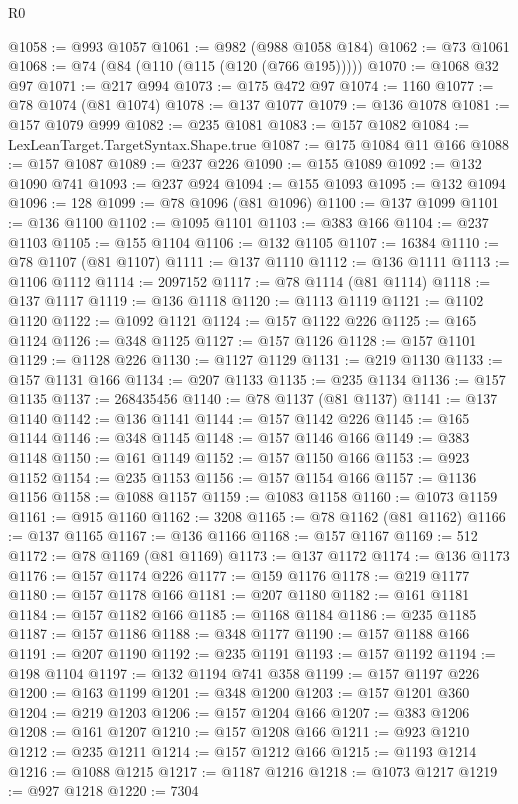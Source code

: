 \begin{lexlean}{R0}
\begin{coremodule}
@1058 := @993 @1057
@1061 := @982 (@988 @1058 @184)
@1062 := @73 @1061
@1068 := @74 (@84 (@110 (@115 (@120 (@766 @195)))))
@1070 := @1068 @32 @97
@1071 := @217 @994
@1073 := @175 @472 @97
@1074 := 1160
@1077 := @78 @1074 (@81 @1074)
@1078 := @137 @1077
@1079 := @136 @1078
@1081 := @157 @1079 @999
@1082 := @235 @1081
@1083 := @157 @1082
@1084 := LexLeanTarget.TargetSyntax.Shape.true
@1087 := @175 @1084 @11 @166
@1088 := @157 @1087
@1089 := @237 @226
@1090 := @155 @1089
@1092 := @132 @1090 @741
@1093 := @237 @924
@1094 := @155 @1093
@1095 := @132 @1094
@1096 := 128
@1099 := @78 @1096 (@81 @1096)
@1100 := @137 @1099
@1101 := @136 @1100
@1102 := @1095 @1101
@1103 := @383 @166
@1104 := @237 @1103
@1105 := @155 @1104
@1106 := @132 @1105
@1107 := 16384
@1110 := @78 @1107 (@81 @1107)
@1111 := @137 @1110
@1112 := @136 @1111
@1113 := @1106 @1112
@1114 := 2097152
@1117 := @78 @1114 (@81 @1114)
@1118 := @137 @1117
@1119 := @136 @1118
@1120 := @1113 @1119
@1121 := @1102 @1120
@1122 := @1092 @1121
@1124 := @157 @1122 @226
@1125 := @165 @1124
@1126 := @348 @1125
@1127 := @157 @1126
@1128 := @157 @1101
@1129 := @1128 @226
@1130 := @1127 @1129
@1131 := @219 @1130
@1133 := @157 @1131 @166
@1134 := @207 @1133
@1135 := @235 @1134
@1136 := @157 @1135
@1137 := 268435456
@1140 := @78 @1137 (@81 @1137)
@1141 := @137 @1140
@1142 := @136 @1141
@1144 := @157 @1142 @226
@1145 := @165 @1144
@1146 := @348 @1145
@1148 := @157 @1146 @166
@1149 := @383 @1148
@1150 := @161 @1149
@1152 := @157 @1150 @166
@1153 := @923 @1152
@1154 := @235 @1153
@1156 := @157 @1154 @166
@1157 := @1136 @1156
@1158 := @1088 @1157
@1159 := @1083 @1158
@1160 := @1073 @1159
@1161 := @915 @1160
@1162 := 3208
@1165 := @78 @1162 (@81 @1162)
@1166 := @137 @1165
@1167 := @136 @1166
@1168 := @157 @1167
@1169 := 512
@1172 := @78 @1169 (@81 @1169)
@1173 := @137 @1172
@1174 := @136 @1173
@1176 := @157 @1174 @226
@1177 := @159 @1176
@1178 := @219 @1177
@1180 := @157 @1178 @166
@1181 := @207 @1180
@1182 := @161 @1181
@1184 := @157 @1182 @166
@1185 := @1168 @1184
@1186 := @235 @1185
@1187 := @157 @1186
@1188 := @348 @1177
@1190 := @157 @1188 @166
@1191 := @207 @1190
@1192 := @235 @1191
@1193 := @157 @1192
@1194 := @198 @1104
@1197 := @132 @1194 @741 @358
@1199 := @157 @1197 @226
@1200 := @163 @1199
@1201 := @348 @1200
@1203 := @157 @1201 @360
@1204 := @219 @1203
@1206 := @157 @1204 @166
@1207 := @383 @1206
@1208 := @161 @1207
@1210 := @157 @1208 @166
@1211 := @923 @1210
@1212 := @235 @1211
@1214 := @157 @1212 @166
@1215 := @1193 @1214
@1216 := @1088 @1215
@1217 := @1187 @1216
@1218 := @1073 @1217
@1219 := @927 @1218
@1220 := 7304

\end{coremodule}
\end{lexlean}
